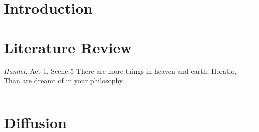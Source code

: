 \documentclass[a4paper, 12pt, twoside]{report}
\begin{document}
% 

 \pagestyle{empty}
 \setcounter{page}{1}
 
 
 \def\localpath{ThesisFrontmatter}
 
 
 \sglspace
 
 
 \tableofcontents
 \newpage
 
 \listoffigures
 \newpage
 
 \listoftables
 \newpage

 
 \newpage
 
 
 \newpage

 \setcounter{page}{0}
 \pagestyle{thesisheadings}
 
 
 \def\localpath{Intro}
 \chapter{Introduction}
 \dblspace
 
 
 \def\localpath{LitReview}
 \chapter{Literature Review}
 \dblspace
 \begin{aquote}{\emph{Hamlet}, Act 1, Scene 5}
  {\selectfont
   There are more things in heaven and earth, Horatio,\\
   Than are dreamt of in your philosophy.
  }
 \end{aquote}
 \rule{\linewidth}{0.25mm}
 

 
 \appendix
 \dblspace
 
 \chapter{Diffusion}
 \def\localpath{Appendices}
 

 \sglspace

 \pagestyle{bibheadings}

 
 
\end{document}
